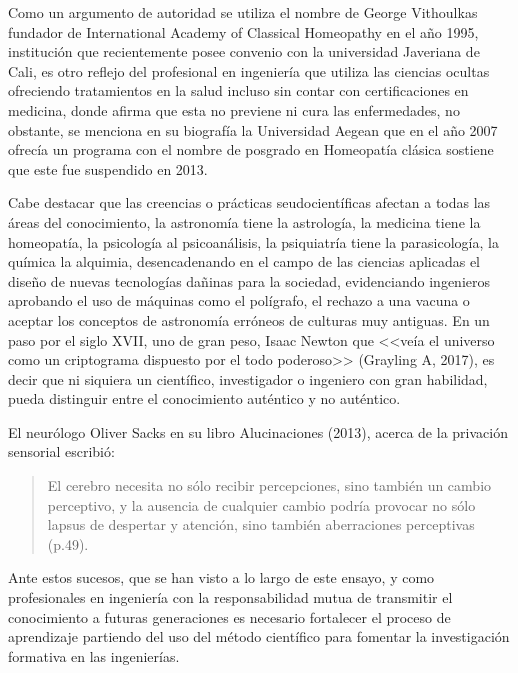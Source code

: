 \documentclass[letterpaper,12pt]{article}
\begin{document}
Como un argumento de autoridad se utiliza el nombre de George Vithoulkas fundador de International Academy of Classical Homeopathy en el año 1995, institución que recientemente posee convenio con la universidad Javeriana de Cali, es otro reflejo del profesional en ingeniería que utiliza las ciencias ocultas ofreciendo tratamientos en la salud incluso sin contar con certificaciones en medicina, donde afirma que esta no previene ni cura las enfermedades, no obstante, se menciona en su biografía la Universidad Aegean que en el año 2007 ofrecía un programa con el nombre de posgrado en Homeopatía clásica sostiene que este fue suspendido en 2013.
\newline %

Cabe destacar que las creencias o prácticas seudocientíficas afectan a todas las áreas del conocimiento, la astronomía tiene la astrología, la medicina tiene la homeopatía, la psicología al psicoanálisis, la psiquiatría tiene la parasicología, la química la alquimia, desencadenando en el campo de las ciencias aplicadas el diseño de nuevas tecnologías dañinas para la sociedad, evidenciando ingenieros aprobando el uso de máquinas como el polígrafo, el rechazo a una vacuna o aceptar los conceptos de astronomía erróneos de culturas muy antiguas.
\newline %
En un paso por el siglo XVII, uno de gran peso, Isaac Newton que <<veía el universo como un criptograma dispuesto por el todo poderoso>> (Grayling A, 2017), es decir que ni siquiera un científico, investigador o ingeniero con gran habilidad, pueda distinguir entre el conocimiento auténtico y no auténtico. 
\newline %

El neurólogo Oliver Sacks en su libro Alucinaciones (2013), acerca de la privación sensorial escribió: 
\begin{quote}
El cerebro necesita no sólo recibir percepciones, sino también un cambio perceptivo, y la ausencia de cualquier cambio podría provocar no sólo lapsus de despertar y atención, sino también aberraciones perceptivas (p.49).
\end{quote} 
\newline %

Ante estos sucesos, que se han visto a lo largo de este ensayo, y como profesionales en ingeniería con la responsabilidad mutua de transmitir el conocimiento a futuras generaciones es necesario fortalecer el proceso de aprendizaje partiendo del uso del método científico para fomentar la investigación formativa en las ingenierías.
\newline %
\end{document}
